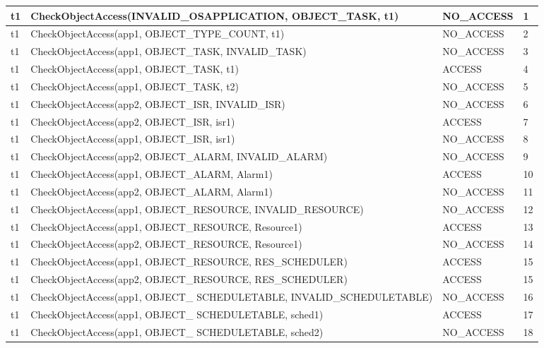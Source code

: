\documentclass[10pt]{article}
\newlength{\Li}\settowidth{\Li}{Running}
\newlength{\Lii}\setlength{\Lii}{7cm}
\newlength{\Liiii}\setlength{\Liiii}{0.9cm}
\newlength{\Liii}\setlength{\Liii}{\textwidth} \addtolength{\Liii}{-\Li} \addtolength{\Liii}{-\Lii} \addtolength{\Liii}{-\Liiii}
\begin{document}
	\begin{supertabular}{|p{\Li}|p{\Lii}|p{\Liii}|p{\Liiii}|} \hline 
	t1		& CheckObjectAccess(INVALID\_OSAPPLICATION, OBJECT\_TASK, t1)				& NO\_ACCESS					& 1 \\ \hline
	t1		& CheckObjectAccess(app1, OBJECT\_TYPE\_COUNT, t1)						& NO\_ACCESS					& 2 \\ \hline
	t1		& CheckObjectAccess(app1, OBJECT\_TASK, INVALID\_TASK)					& NO\_ACCESS					& 3 \\ \hline
	t1		& CheckObjectAccess(app1, OBJECT\_TASK, t1)								& ACCESS						& 4 \\ \hline
	t1		& CheckObjectAccess(app1, OBJECT\_TASK, t2)								& NO\_ACCESS					& 5 \\ \hline
	
	t1		& CheckObjectAccess(app2, OBJECT\_ISR, INVALID\_ISR)						& NO\_ACCESS					& 6 \\ \hline
	t1		& CheckObjectAccess(app2, OBJECT\_ISR, isr1)								& ACCESS						& 7 \\ \hline
	t1		& CheckObjectAccess(app1, OBJECT\_ISR, isr1)								& NO\_ACCESS					& 8 \\ \hline
	
	t1		& CheckObjectAccess(app2, OBJECT\_ALARM, INVALID\_ALARM)				& NO\_ACCESS					& 9 \\ \hline
	t1		& CheckObjectAccess(app1, OBJECT\_ALARM, Alarm1)							& ACCESS						& 10 \\ \hline
	t1		& CheckObjectAccess(app2, OBJECT\_ALARM, Alarm1)							& NO\_ACCESS					& 11 \\ \hline
	
	t1		& CheckObjectAccess(app1, OBJECT\_RESOURCE, INVALID\_RESOURCE)			& NO\_ACCESS					& 12 \\ \hline
	t1		& CheckObjectAccess(app1, OBJECT\_RESOURCE, Resource1)					& ACCESS						& 13 \\ \hline
	t1		& CheckObjectAccess(app2, OBJECT\_RESOURCE, Resource1)					& NO\_ACCESS					& 14 \\ \hline
	t1		& CheckObjectAccess(app1, OBJECT\_RESOURCE, RES\_SCHEDULER)			& ACCESS						& 15 \\ \hline
	t1		& CheckObjectAccess(app2, OBJECT\_RESOURCE, RES\_SCHEDULER)			& ACCESS						& 15 \\ \hline
	
	t1		& CheckObjectAccess(app1, OBJECT\_ SCHEDULETABLE, INVALID\_SCHEDULETABLE)	& NO\_ACCESS				& 16 \\ \hline
	t1		& CheckObjectAccess(app1, OBJECT\_ SCHEDULETABLE, sched1)				& ACCESS						& 17 \\ \hline
	t1		& CheckObjectAccess(app1, OBJECT\_ SCHEDULETABLE, sched2)				& NO\_ACCESS					& 18 \\ \hline
	

\end{supertabular}
\end{document}
